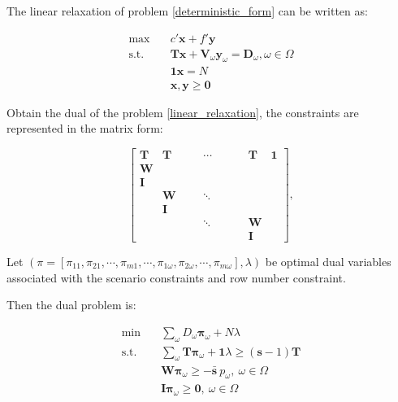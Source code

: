 The linear relaxation of problem \eqref{deterministic_form} can be written as:

\begin{equation}\label{linear_relaxation}
  \begin{aligned}
    \max \quad & c{'} \mathbf{x} + f{'} \mathbf{y} \\
    \text {s.t.} \quad & \mathbf{T} \mathbf{x} + \mathbf{V}_\omega \mathbf{y}_\omega = \mathbf{D}_\omega, \omega\in \Omega \\
    & \mathbf{1} \mathbf{x} = N \\
    & \mathbf{x}, \mathbf{y} \geq \mathbf{0}
  \end{aligned}
\end{equation}

Obtain the dual of the problem \eqref{linear_relaxation}, the constraints are represented in the matrix form:

$$
\left[\begin{array}{cccccccccc}
\mathbf{T} & \mathbf{T} & & & \cdots & & & & \mathbf{T}  & \mathbf{1} \\
\mathbf{W} & & & & & & & & & \\
\mathbf{I} & & & & & & & & & \\
 & \mathbf{W}& & & \ddots & & & & & \\
  & \mathbf{I} & & & & & & & &  \\
  & & & & \ddots & & & & \mathbf{W} & \\
  & &  & & & & & & \mathbf{I} &  
\end{array}\right],
$$

Let $(\pi=\left[\pi_{11}, \pi_{21},\cdots,\pi_{m 1}, \cdots, \pi_{1 \omega}, \pi_{2 \omega}, \cdots, \pi_{m \omega}\right],\lambda)$ be optimal dual variables associated with the scenario constraints and row number constraint.

Then the dual problem is:

\begin{align}
    \min \quad & \sum_{\omega} D_{\omega} \mathbf{\pi}_{\omega} + N \lambda \\
    \text {s.t.} \quad & \sum_{\omega} \mathbf{T} \mathbf{\pi}_{\omega} + \mathbf{1} \lambda \geq (\mathbf{s}-1)\mathbf{T} \\
    & \mathbf{W} \mathbf{\pi}_{\omega} \geq -\mathbf{\bar{s}}~p_{\omega}, ~\omega \in \Omega \label{W_dual} \\ 
    & \mathbf{I} \mathbf{\pi}_{\omega} \geq \mathbf{0}, ~\omega \in \Omega \label{I_dual} 
\end{align}

